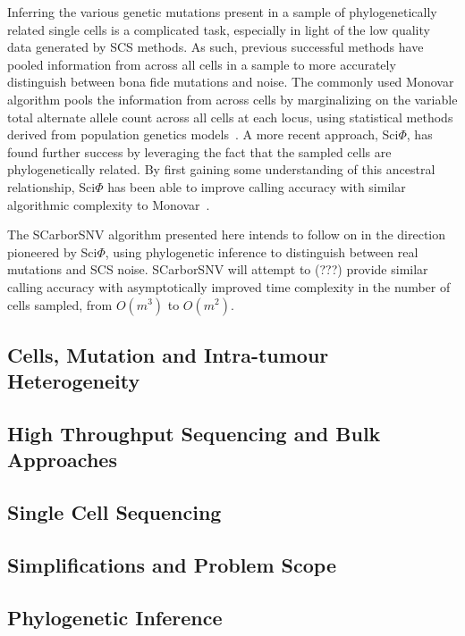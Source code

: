\documentclass[../main.tex]{subfiles}
\begin{document}
Inferring the various genetic mutations present in a sample of phylogenetically related single cells is a complicated task, especially in light of the low quality data generated by SCS methods.
As such, previous successful methods have pooled information from across all cells in a sample to more accurately distinguish between bona fide mutations and noise.
The commonly used Monovar algorithm pools the information from across cells by marginalizing on the variable total alternate allele count across all cells at each locus, using statistical methods derived from population genetics models~\cite{monovar}.
A more recent approach, Sci$\Phi$, has found further success by leveraging the fact that the sampled cells are phylogenetically related.
By first gaining some understanding of this ancestral relationship, Sci$\Phi$ has been able to improve calling accuracy with similar algorithmic complexity to Monovar~\cite{sciphi}.

The SCarborSNV algorithm presented here intends to follow on in the direction pioneered by Sci$\Phi$, using phylogenetic inference to distinguish between real mutations and SCS noise.
SCarborSNV will attempt to (???) provide similar calling accuracy with asymptotically improved time complexity in the number of cells sampled, from $O(m^3)$ to $O(m^2)$.

\subsection{Cells, Mutation and Intra-tumour Heterogeneity}


\subsection{High Throughput Sequencing and Bulk Approaches}


\subsection{Single Cell Sequencing}


\subsection{Simplifications and Problem Scope}


\subsection{Phylogenetic Inference}

 
\end{document}

